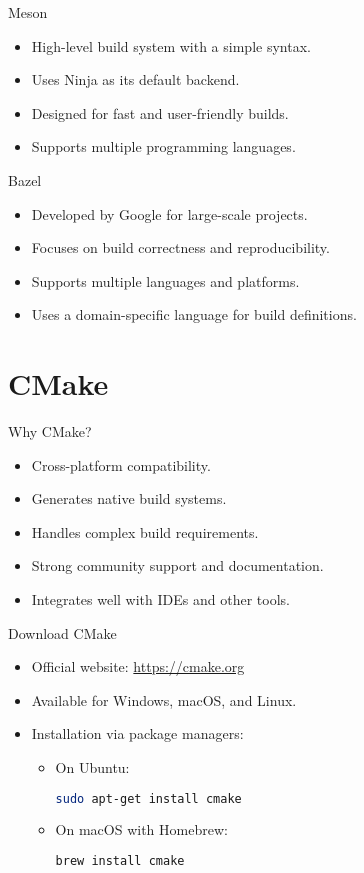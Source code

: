 \documentclass{beamer}
\begin{document}
\begin{frame}{Meson}
  \begin{itemize}
    \item High-level build system with a simple syntax.
    \item Uses Ninja as its default backend.
    \item Designed for fast and user-friendly builds.
    \item Supports multiple programming languages.
  \end{itemize}
\end{frame}

\begin{frame}{Bazel}
  \begin{itemize}
    \item Developed by Google for large-scale projects.
    \item Focuses on build correctness and reproducibility.
    \item Supports multiple languages and platforms.
    \item Uses a domain-specific language for build definitions.
  \end{itemize}
\end{frame}

\section{CMake}

\begin{frame}{Why CMake?}
  \begin{itemize}
    \item Cross-platform compatibility.
    \item Generates native build systems.
    \item Handles complex build requirements.
    \item Strong community support and documentation.
    \item Integrates well with IDEs and other tools.
  \end{itemize}
\end{frame}

\begin{frame}[fragile]{Download CMake}
  \begin{itemize}
    \item Official website: \url{https://cmake.org}
    \item Available for Windows, macOS, and Linux.
    \item Installation via package managers:
    \begin{itemize}
      \item On Ubuntu:
      \begin{lstlisting}[language=bash]
sudo apt-get install cmake
      \end{lstlisting}
      \item On macOS with Homebrew:
      \begin{lstlisting}[language=bash]
brew install cmake
      \end{lstlisting}
    \end{itemize}
  \end{itemize}
\end{frame}
\end{document}
